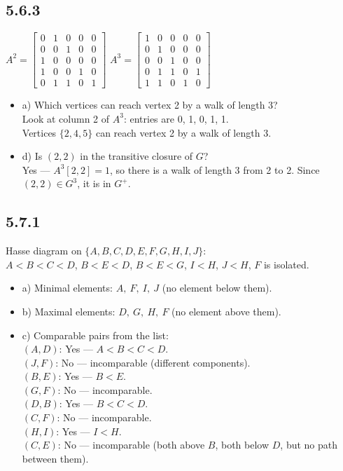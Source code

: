 \documentclass{article}
\begin{document}
\subsection*{5.6.3}
$A^2 = \begin{bmatrix} 0&1&0&0&0 \\ 0&0&1&0&0 \\ 1&0&0&0&0 \\ 1&0&0&1&0 \\ 0&1&1&0&1 \end{bmatrix}$\quad
$A^3 = \begin{bmatrix} 1&0&0&0&0 \\ 0&1&0&0&0 \\ 0&0&1&0&0 \\ 0&1&1&0&1 \\ 1&1&0&1&0 \end{bmatrix}$
\begin{itemize}
    \item a) Which vertices can reach vertex 2 by a walk of length 3?\\
    Look at column 2 of $A^3$: entries are 0, 1, 0, 1, 1.\\
    Vertices $\{2, 4, 5\}$ can reach vertex 2 by a walk of length 3.

    \item d) Is $(2,2)$ in the transitive closure of $G$?\\
    Yes --- $A^3[2,2] = 1$, so there is a walk of length 3 from 2 to 2. Since $(2,2) \in G^3$, it is in $G^+$.
\end{itemize}

\subsection*{5.7.1}
Hasse diagram on $\{A,B,C,D,E,F,G,H,I,J\}$:\\
$A < B < C < D$, $B < E < D$, $B < E < G$, $I < H$, $J < H$, $F$ is isolated.
\begin{itemize}
    \item a) Minimal elements: $A,\ F,\ I,\ J$ (no element below them).
    \item b) Maximal elements: $D,\ G,\ H,\ F$ (no element above them).
    \item c) Comparable pairs from the list:\\
    $(A, D)$: Yes --- $A < B < C < D$.\\
    $(J, F)$: No --- incomparable (different components).\\
    $(B, E)$: Yes --- $B < E$.\\
    $(G, F)$: No --- incomparable.\\
    $(D, B)$: Yes --- $B < C < D$.\\
    $(C, F)$: No --- incomparable.\\
    $(H, I)$: Yes --- $I < H$.\\
    $(C, E)$: No --- incomparable (both above $B$, both below $D$, but no path between them).
\end{itemize}
\end{document}
